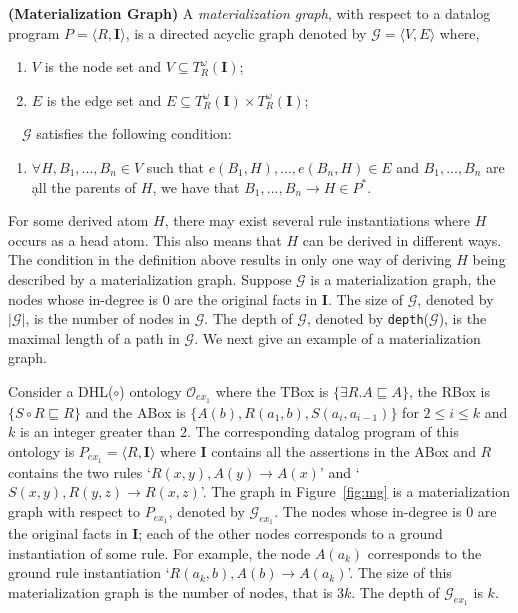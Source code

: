 \documentclass[final,1p,times]{elsarticle}
\begin{document}
\begin{definition}
\textbf{(Materialization Graph)}\label{def:mg}
A \emph{materialization graph}, with respect to
a datalog program $P=\langle R, \textbf{I}\rangle$, is a directed acyclic graph
denoted by $\mathcal{G}=\langle V, E\rangle$ where,
\begin{enumerate}[leftmargin=4ex,label=$\bullet$]
  \item $V$ is the node set and $V\subseteq T_R^{\omega}(\textbf{I})$;
  \item $E$ is the edge set and $E\subseteq T_R^{\omega}(\textbf{I})\times T_R^{\omega}(\textbf{I})$;
\end{enumerate}
~~$\mathcal{G}$ satisfies the following condition:
\begin{enumerate}[leftmargin=4ex,label=$\bullet$]
  \item $\forall H,B_1,...,B_n\in V$ such that $e(B_1, H),...,e(B_n, H)\in E$ and
  $B_1,...,B_n$ are \d{all} the parents of $H$, we have that
  $B_1,...,B_n\rightarrow H\in P^*$.
\end{enumerate}
\end{definition}

For some derived atom $H$, there may exist several rule instantiations where $H$
occurs as a head atom.
This also means that $H$ can be derived in different ways.
The condition in the definition above results in only one way of deriving $H$ being
described by a materialization graph.
Suppose $\mathcal{G}$ is a materialization graph, the nodes whose in-degree is 0 are the
original facts in $\textbf{I}$.
The size of $\mathcal{G}$, denoted by $|\mathcal{G}|$, is the number of nodes in $\mathcal{G}$.
The depth of $\mathcal{G}$, denoted by \texttt{depth}($\mathcal{G}$), is the maximal length of a path
in $\mathcal{G}$.
We next give an example of a materialization graph.\\

\begin{example}\label{exp:mg}
Consider a DHL($\circ$) ontology $\mathcal{O}_{ex_1}$ where the TBox is
$\{\exists R.A\sqsubseteq A\}$, the RBox is $\{S\circ R\sqsubseteq R\}$ and
the ABox is $\{A(b),R(a_1,b),S(a_i,a_{i-1})\}$ for $2\leq i\leq k$ and
$k$ is an integer greater than $2$.
The corresponding datalog program of this ontology is $P_{ex_1}=\langle R, \textbf{I}\rangle$
where $\textbf{I}$ contains all the assertions in the ABox
and $R$ contains the two rules `$R(x,y),A(y)\rightarrow A(x)$'
and `$S(x,y),R(y,z)\rightarrow R(x,z)$'.
The graph in Figure~\ref{fig:mg} is a materialization graph with respect to $P_{ex_1}$,
denoted by $\mathcal{G}_{ex_1}$.
The nodes whose in-degree is 0 are the original facts in $\textbf{I}$;
each of the other nodes corresponds to a ground instantiation of some rule.
For example, the node $A(a_k)$ corresponds to the ground rule instantiation
`$R(a_k,b),A(b)\rightarrow A(a_k)$'.
The size of this materialization graph is the number of nodes, that is $3k$.
The depth of $\mathcal{G}_{ex_1}$ is $k$.
\end{example}
\end{document}
